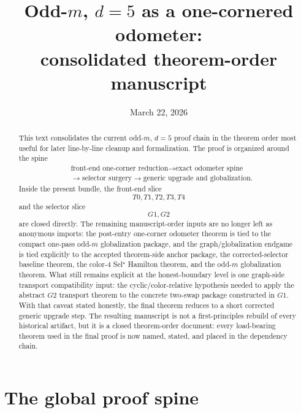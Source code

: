 \documentclass[11pt]{article}
\title{Odd-$m$, $d=5$ as a one-cornered odometer:\\
consolidated theorem-order manuscript}
\author{}
\date{March 22, 2026}
\begin{document}
\maketitle

\begin{abstract}
This text consolidates the current odd-$m$, $d=5$ proof chain in the theorem
order most useful for later line-by-line cleanup and formalization.
The proof is organized around the spine
\[
\begin{aligned}
&\text{front-end one-corner reduction}
\to
\text{exact odometer spine}\\
&\to
\text{selector surgery}
\to
\text{generic upgrade and globalization}.
\end{aligned}
\]
Inside the present bundle, the front-end slice
\[
T0,T1,T2,T3,T4
\]
and the selector slice
\[
G1,G2
\]
are closed directly.
The remaining manuscript-order inputs are no longer left as anonymous imports:
the post-entry one-corner odometer theorem is tied to the compact one-pass
odd-$m$ globalization package, and the graph/globalization endgame is tied
explicitly to the accepted theorem-side anchor package, the corrected-selector
baseline theorem, the color-$4$ Sel$^{\star}$ Hamilton theorem, and the
odd-$m$ globalization theorem.
What still remains explicit at the honest-boundary level is one graph-side
transport compatibility input: the cyclic/color-relative hypothesis needed to
apply the abstract \(G2\) transport theorem to the concrete two-swap package
constructed in \(G1\).
With that caveat stated honestly, the final theorem reduces to a short corrected
generic upgrade step.
The resulting manuscript is not a first-principles rebuild of every historical
artifact, but it is a closed theorem-order document: every load-bearing theorem
used in the final proof is now named, stated, and placed in the dependency
chain.
\end{abstract}

\tableofcontents

\section{The global proof spine}
\end{document}
